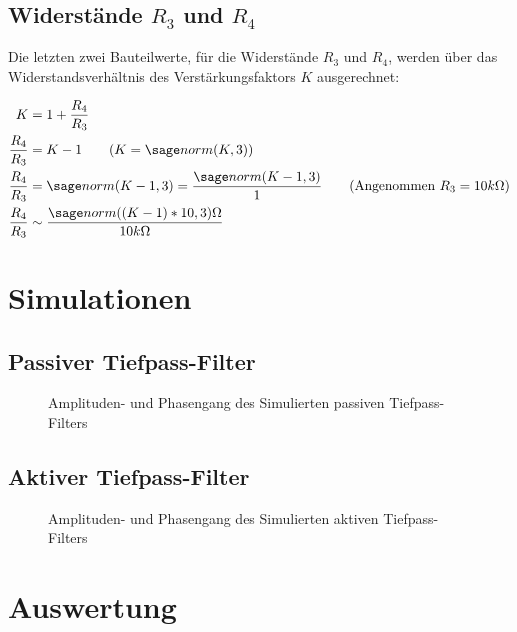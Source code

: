 \documentclass[a4paper]{hitec}
\begin{document}
\subsection{Widerstände $R_3$ und $R_4$}

Die letzten zwei Bauteilwerte, für die Widerstände $R_3$ und $R_4$, werden über das Widerstandsverhältnis des Verstärkungsfaktors $K$ ausgerechnet:

\begin{align*}
    K &= 1 + \frac{R_4}{R_3} \\
    \frac{R_4}{R_3} &= K - 1 \tag*{($K = \var{K,3}$)} \\
    \frac{R_4}{R_3} &= \var{K-1,3} = \frac{\var{K-1,3}}{1} \tag*{(Angenommen $R_3 = 10k\Omega$)} \\
    \frac{R_4}{R_3} &\sim \frac{\var{(K-1)*10,3}\Omega}{10k\Omega}
\end{align*}

\section{Simulationen}

\subsection{Passiver Tiefpass-Filter }

\begin{figure}[H]
    \centering
    
    \caption{Amplituden- und Phasengang des Simulierten passiven Tiefpass-Filters}
\end{figure}

\subsection{Aktiver Tiefpass-Filter }

\begin{figure}[H]
    \centering
    
    \caption{Amplituden- und Phasengang des Simulierten aktiven Tiefpass-Filters}
\end{figure}

\clearpage

\section{Auswertung}
\end{document}
